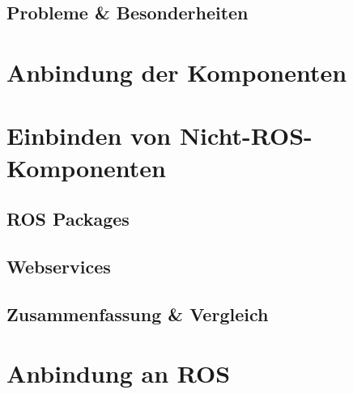 \subsection{Probleme \& Besonderheiten}


\section{Anbindung der Komponenten}




\section{Einbinden von Nicht-ROS-Komponenten}


\subsection{ROS Packages}


\subsection{Webservices}




\subsection{Zusammenfassung \& Vergleich}


\section{Anbindung an ROS}
